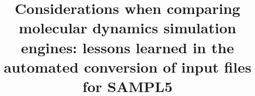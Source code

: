 %
%
%
%
%
%
\RequirePackage{fix-cm}
%
\documentclass[smallextended]{svjour3}       %
%
\smartqed  %
%
\usepackage{graphicx}
\usepackage{tabulary}
%
%
\usepackage{array}
\usepackage{color}
\usepackage{caption}
\usepackage{float}
\usepackage{amssymb}
\usepackage{multirow}
\usepackage{multirow}
\usepackage[numbers, square,sort&compress]{natbib}
\graphicspath{{figures/}}
%
\newcommand{\BibTex}{\textsc{Bib}\TeX}
\newcommand{\erfc}{\mathrm{erfc}}
%
%


\title{Considerations when comparing molecular dynamics simulation engines: lessons learned in the automated conversion of input files for SAMPL5}

